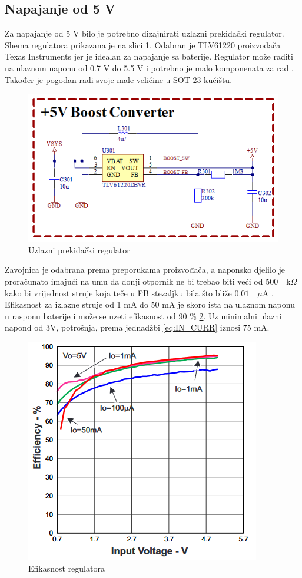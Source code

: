 \subsection{Napajanje od 5 V}

Za napajanje od 5 V bilo je potrebno dizajnirati uzlazni prekidački regulator. Shema regulatora prikazana je na slici \ref{slk:BR_BOOST}. Odabran je TLV61220 proizvođača Texas Instruments jer je idealan za napajanje sa baterije. Regulator može raditi na ulaznom naponu od 0.7 V do 5.5 V i potrebno je malo komponenata za rad \cite{ti:tlv61220}. Također je pogodan radi svoje male veličine u SOT-23 kućištu.
\begin{figure}[htb]
    \centering
    \includegraphics[width=13 cm]{Figures/BR_BOOST.png}
    \caption{Uzlazni prekidački regulator}
    \label{slk:BR_BOOST}
\end{figure}
Zavojnica je odabrana prema preporukama proizvođača, a naponsko djelilo je proračunato imajući na umu da donji otpornik ne bi trebao biti veći od $500\quad \textrm{k}\Omega$ kako bi vrijednost struje koja teče u FB stezaljku bila što bliže $0.01 \quad \mu \textrm{A}$ \cite{ti:tlv61220}.
Efikasnost za izlazne struje od 1 mA do 50 mA je skoro ista na ulaznom naponu u rasponu baterije i može se uzeti efikasnost od 90 \% \ref{slk:BOOST_EFF}. Uz minimalni ulazni napond od 3V, potrošnja, prema jednadžbi \ref{eq:IN_CURR} iznosi 75 mA.
\begin{figure}[htb]
    \centering
    \includegraphics[width=8 cm]{Figures/BOOST_EFF.png}
    \caption{Efikasnost regulatora \cite{ti:tlv61220}}
    \label{slk:BOOST_EFF}
\end{figure}

